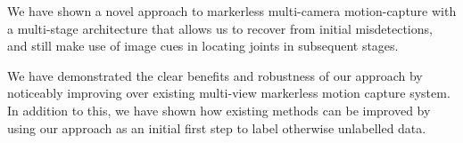 \documentclass[10pt,twocolumn,letterpaper]{article}
\begin{document}
We have shown a novel approach to markerless multi-camera 
motion-capture with a multi-stage architecture that allows us to
recover from initial misdetections, and still make use of image cues
in locating joints in subsequent stages.

We have demonstrated the clear benefits and robustness of our approach by
noticeably improving over existing multi-view markerless motion capture system.
In addition to this, we have shown how existing methods can be 
improved by using our approach as an initial first step to label otherwise
unlabelled data.


\small


\end{document}
